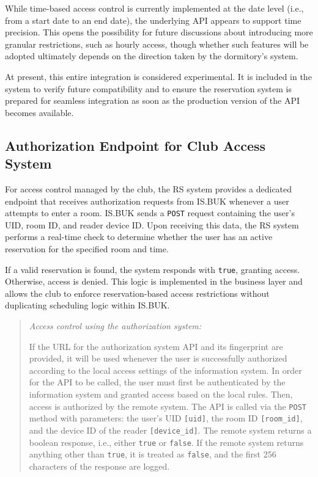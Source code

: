 While time-based access control is currently implemented at the date level (i.e., from a start date to an end date), the underlying API appears to support time precision. This opens the possibility for future discussions about introducing more granular restrictions, such as hourly access, though whether such features will be adopted ultimately depends on the direction taken by the dormitory’s system.

At present, this entire integration is considered experimental. It is included in the system to verify future compatibility and to ensure the reservation system is prepared for seamless integration as soon as the production version of the API becomes available.

\subsection{Authorization Endpoint for Club Access System}

For access control managed by the club, the RS system provides a dedicated endpoint that receives authorization requests from IS.BUK whenever a user attempts to enter a room. IS.BUK sends a \texttt{POST} request containing the user's UID, room ID, and reader device ID. Upon receiving this data, the RS system performs a real-time check to determine whether the user has an active reservation for the specified room and time.

If a valid reservation is found, the system responds with \texttt{true}, granting access. Otherwise, access is denied. This logic is implemented in the business layer and allows the club to enforce reservation-based access restrictions without duplicating scheduling logic within IS.BUK.

\begin{quote}
\textit{Access control using the authorization system:}

If the URL for the authorization system API and its fingerprint are provided, it will be used whenever the user is successfully authorized according to the local access settings of the information system. In order for the API to be called, the user must first be authenticated by the information system and granted access based on the local rules. Then, access is authorized by the remote system. The API is called via the \texttt{POST} method with parameters: the user's UID \texttt{[uid]}, the room ID \texttt{[room\_id]}, and the device ID of the reader \texttt{[device\_id]}. The remote system returns a boolean response, i.e., either \texttt{true} or \texttt{false}. If the remote system returns anything other than \texttt{true}, it is treated as \texttt{false}, and the first 256 characters of the response are logged.
\end{quote}

